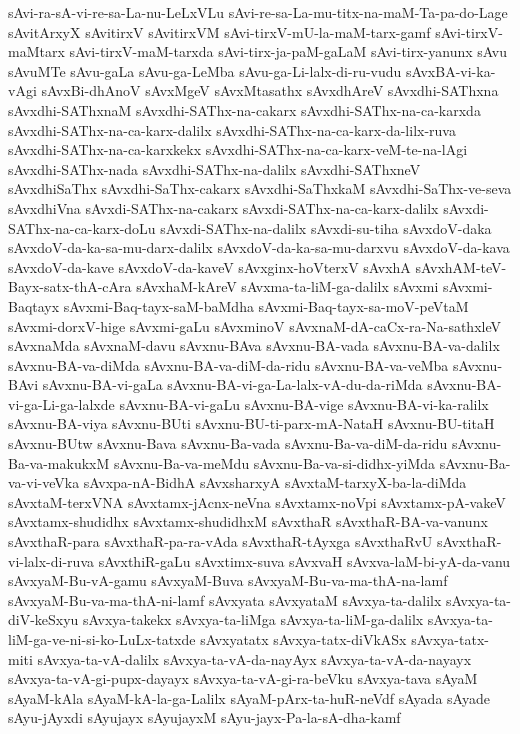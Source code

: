 {sAvi-ra-sA-vi-re-sa-La-nu-LeLxVLu
sAvi-re-sa-La-mu-titx-na-maM-Ta-pa-do-Lage
sAvitArxyX
sAvitirxV
sAvitirxVM
sAvi-tirxV-mU-la-maM-tarx-gamf
sAvi-tirxV-maMtarx
sAvi-tirxV-maM-tarxda
sAvi-tirx-ja-paM-gaLaM
sAvi-tirx-yanunx
sAvu
sAvuMTe
sAvu-gaLa
sAvu-ga-LeMba
sAvu-ga-Li-lalx-di-ru-vudu
sAvxBA-vi-ka-vAgi
sAvxBi-dhAnoV
sAvxMgeV
sAvxMtasathx
sAvxdhAreV
sAvxdhi-SAThxna
sAvxdhi-SAThxnaM
sAvxdhi-SAThx-na-cakarx
sAvxdhi-SAThx-na-ca-karxda
sAvxdhi-SAThx-na-ca-karx-dalilx
sAvxdhi-SAThx-na-ca-karx-da-lilx-ruva
sAvxdhi-SAThx-na-ca-karxkekx
sAvxdhi-SAThx-na-ca-karx-veM-te-na-lAgi
sAvxdhi-SAThx-nada
sAvxdhi-SAThx-na-dalilx
sAvxdhi-SAThxneV
sAvxdhiSaThx
sAvxdhi-SaThx-cakarx
sAvxdhi-SaThxkaM
sAvxdhi-SaThx-ve-seva
sAvxdhiVna
sAvxdi-SAThx-na-cakarx
sAvxdi-SAThx-na-ca-karx-dalilx
sAvxdi-SAThx-na-ca-karx-doLu
sAvxdi-SAThx-na-dalilx
sAvxdi-su-tiha
sAvxdoV-daka
sAvxdoV-da-ka-sa-mu-darx-dalilx
sAvxdoV-da-ka-sa-mu-darxvu
sAvxdoV-da-kava
sAvxdoV-da-kave
sAvxdoV-da-kaveV
sAvxginx-hoVterxV
sAvxhA
sAvxhAM-teV-Bayx-satx-thA-cAra
sAvxhaM-kAreV
sAvxma-ta-liM-ga-dalilx
sAvxmi
sAvxmi-Baqtayx
sAvxmi-Baq-tayx-saM-baMdha
sAvxmi-Baq-tayx-sa-moV-peVtaM
sAvxmi-dorxV-hige
sAvxmi-gaLu
sAvxminoV
sAvxnaM-dA-caCx-ra-Na-sathxleV
sAvxnaMda
sAvxnaM-davu
sAvxnu-BAva
sAvxnu-BA-vada
sAvxnu-BA-va-dalilx
sAvxnu-BA-va-diMda
sAvxnu-BA-va-diM-da-ridu
sAvxnu-BA-va-veMba
sAvxnu-BAvi
sAvxnu-BA-vi-gaLa
sAvxnu-BA-vi-ga-La-lalx-vA-du-da-riMda
sAvxnu-BA-vi-ga-Li-ga-lalxde
sAvxnu-BA-vi-gaLu
sAvxnu-BA-vige
sAvxnu-BA-vi-ka-ralilx
sAvxnu-BA-viya
sAvxnu-BUti
sAvxnu-BU-ti-parx-mA-NataH
sAvxnu-BU-titaH
sAvxnu-BUtw
sAvxnu-Bava
sAvxnu-Ba-vada
sAvxnu-Ba-va-diM-da-ridu
sAvxnu-Ba-va-makukxM
sAvxnu-Ba-va-meMdu
sAvxnu-Ba-va-si-didhx-yiMda
sAvxnu-Ba-va-vi-veVka
sAvxpa-nA-BidhA
sAvxsharxyA
sAvxtaM-tarxyX-ba-la-diMda
sAvxtaM-terxVNA
sAvxtamx-jAcnx-neVna
sAvxtamx-noVpi
sAvxtamx-pA-vakeV
sAvxtamx-shudidhx
sAvxtamx-shudidhxM
sAvxthaR
sAvxthaR-BA-va-vanunx
sAvxthaR-para
sAvxthaR-pa-ra-vAda
sAvxthaR-tAyxga
sAvxthaRvU
sAvxthaR-vi-lalx-di-ruva
sAvxthiR-gaLu
sAvxtimx-suva
sAvxvaH
sAvxva-laM-bi-yA-da-vanu
sAvxyaM-Bu-vA-gamu
sAvxyaM-Buva
sAvxyaM-Bu-va-ma-thA-na-lamf
sAvxyaM-Bu-va-ma-thA-ni-lamf
sAvxyata
sAvxyataM
sAvxya-ta-dalilx
sAvxya-ta-diV-keSxyu
sAvxya-takekx
sAvxya-ta-liMga
sAvxya-ta-liM-ga-dalilx
sAvxya-ta-liM-ga-ve-ni-si-ko-LuLx-tatxde
sAvxyatatx
sAvxya-tatx-diVkASx
sAvxya-tatx-miti
sAvxya-ta-vA-dalilx
sAvxya-ta-vA-da-nayAyx
sAvxya-ta-vA-da-nayayx
sAvxya-ta-vA-gi-pupx-dayayx
sAvxya-ta-vA-gi-ra-beVku
sAvxya-tava
sAyaM
sAyaM-kAla
sAyaM-kA-la-ga-Lalilx
sAyaM-pArx-ta-huR-neVdf
sAyada
sAyade
sAyu-jAyxdi
sAyujayx
sAyujayxM
sAyu-jayx-Pa-la-sA-dha-kamf
}
